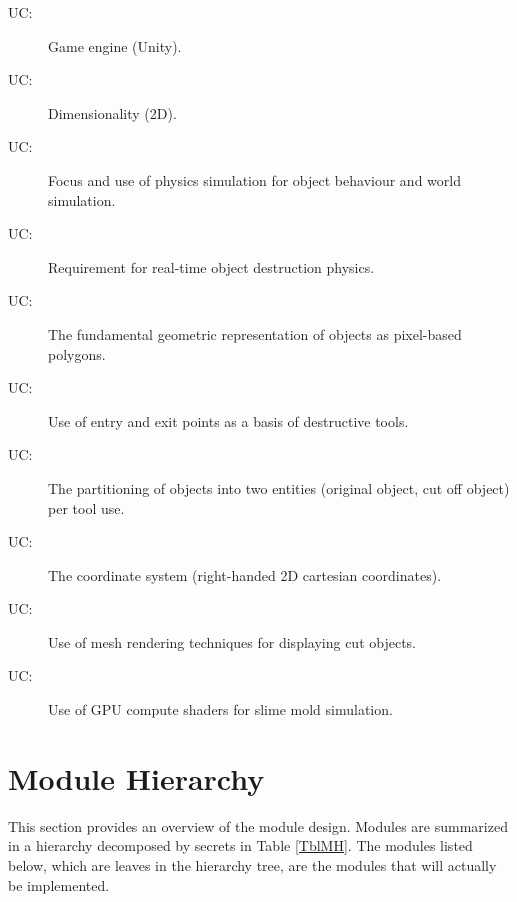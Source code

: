 \documentclass[12pt, titlepage]{article}
\newcounter{ucnum}
\newcommand{\uctheucnum}{UC\theucnum}
\begin{document}
\begin{description}
\item[ \uctheucnum\label{UC1}:] Game engine (Unity).
\item[ \uctheucnum\label{UC2}:] Dimensionality (2D).
\item[ \uctheucnum\label{UC3}:] Focus and use of physics simulation for object behaviour and world simulation.
\item[ \uctheucnum\label{UC4}:] Requirement for real-time object destruction physics.
\item[ \uctheucnum\label{UC5}:] The fundamental geometric representation of objects as pixel-based polygons.
\item[ \uctheucnum\label{UC6}:] Use of entry and exit points as a basis of destructive tools.
\item[ \uctheucnum\label{UC7}:] The partitioning of objects into two entities (original object, cut off object) per tool use.
\item[ \uctheucnum\label{UC8}:] The coordinate system (right-handed 2D cartesian coordinates).
\item[ \uctheucnum\label{UC9}:] Use of mesh rendering techniques for displaying cut objects.
\item[ \uctheucnum\label{UC10}:] Use of GPU compute shaders for slime mold simulation.
\end{description}

\section{Module Hierarchy} \label{SecMH}

This section provides an overview of the module design. Modules are summarized
in a hierarchy decomposed by secrets in Table \ref{TblMH}. The modules listed
below, which are leaves in the hierarchy tree, are the modules that will
actually be implemented.
\end{document}
